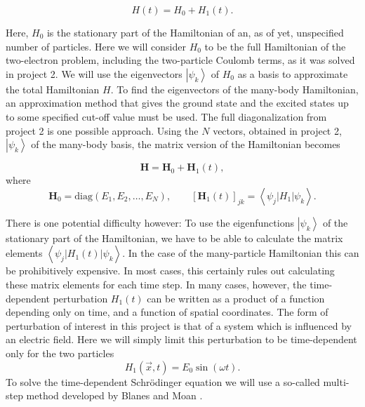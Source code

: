 \documentclass[10pt]{revtex4}
\begin{document}
\begin{equation}
H\left(t\right) = H_0 + H_1 \left( t \right).
\end{equation}

Here, $H_0$ is the stationary part of the Hamiltonian of an, as of yet, unspecified number of particles.  Here we will consider $H_0$ to be the full Hamiltonian of the two-electron problem, including the two-particle Coulomb terms, as it was solved in project 2. 
We will use the eigenvectors $ \left| \psi_k \right\rangle $ of $H_0$ 
as a basis to approximate the total Hamiltonian $H$. 
To find the eigenvectors of the many-body Hamiltonian, an approximation method that gives the ground state and the excited states up to some specified cut-off value must be used. The full diagonalization from project 2 is one possible approach. Using the $N$ vectors, obtained in project 2, 
$\left| \psi_k  \right\rangle$ of the many-body basis, the matrix version of the Hamiltonian becomes

\begin{equation}
 \mathbf{H}=\mathbf{H}_0+\mathbf{H}_1\left(t\right),
\end{equation}
where
\begin{equation}
 \mathbf{H}_0 = \mathrm{diag} \left(E_1,E_2,\ldots,E_N \right), \qquad 
 \left[ \mathbf{H}_1\left( t \right) \right] _{jk} = \left\langle \psi_j | H_1 | \psi_k \right\rangle.
\end{equation}

There is one potential difficulty however: To use the eigenfunctions
$\left| \psi_k \right\rangle$ of the stationary part of the
Hamiltonian, we have to be able to calculate the matrix elements
$\left\langle \psi_j | H_1\left(t\right) | \psi_k \right\rangle$. In
the case of the many-particle Hamiltonian this can be prohibitively
expensive. In most cases, this certainly rules out calculating these
matrix elements for each time step. In many cases, however, the
time-dependent perturbation $H_1\left(t\right)$ can be written as a
product of a function depending only on time, and a function of
spatial coordinates.  The form of perturbation of interest in this
project is that of a system which is influenced by an electric field.
Here we will simply limit this perturbation to be time-dependent only
for the two particles
\begin{equation}
H_1 \left(\vec{x},t\right) = E_{0} \sin \left(\omega t\right).
\label{sdjfhkajlsdfhuithrt}
\end{equation}
To solve the time-dependent Schr\"odinger equation we will use a so-called multi-step method developed by Blanes and Moan
\cite{blanesmoan2005}.
\end{document}
